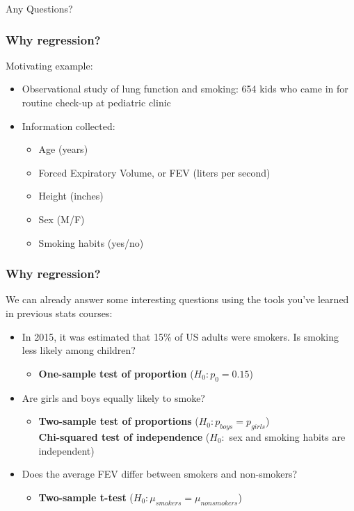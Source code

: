 \documentclass[12pt, 
hyperref={colorlinks=true, linkcolor=blue, urlcolor=cyan}]{beamer}
\begin{document}
\begin{frame}
\center \Large Any Questions?
\end{frame}

\begin{frame}
\frametitle{Why regression?}
Motivating example:
\begin{itemize} 
\item Observational study of lung function and smoking: 654 kids who came in for routine check-up at pediatric clinic
\item Information collected:
	\begin{itemize}
	\item Age (years)
	\item Forced Expiratory Volume, or FEV (liters per second) 
	\item Height (inches)
	\item Sex (M/F)
	\item Smoking habits (yes/no)
	\end{itemize}
\end{itemize}
\end{frame}

\begin{frame}
\frametitle{Why regression?} %
We can already answer some interesting questions using the tools you've learned in previous stats courses: 
\begin{itemize} 
\item In 2015, it was estimated that 15\% of US adults were smokers. Is smoking less likely among children? 
	\begin{itemize}
	\item \textbf{One-sample test of proportion} ($H_0: p_0 = 0.15$)
	\end{itemize}
\item Are girls and boys equally likely to smoke?
	\begin{itemize}
	\item \textbf{Two-sample test of proportions} ($H_0: p_{boys} = p_{girls}$) \\ \textbf{Chi-squared test of independence} ($H_0:$ sex and smoking habits are independent)
	\end{itemize}
\item Does the average FEV differ between smokers and non-smokers?
	\begin{itemize}
	\item \textbf{Two-sample t-test} ($H_0: \mu_{smokers} = \mu_{nonsmokers}$)
	\end{itemize}
\end{itemize}
\end{frame}
\end{document}
